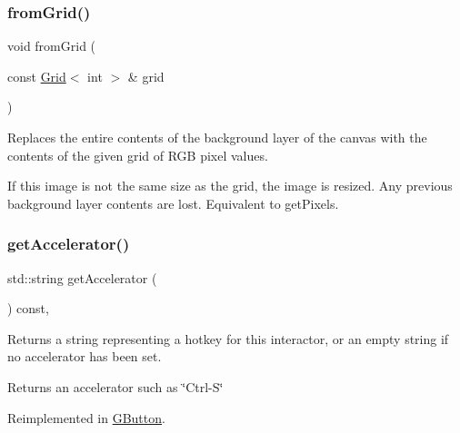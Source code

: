 \subsubsection{\texorpdfstring{from\+Grid()}{fromGrid()}}
{\footnotesize\ttfamily void from\+Grid (\begin{DoxyParamCaption}\item[{const \mbox{\hyperlink{classGrid}{Grid}}$<$ int $>$ \&}]{grid }\end{DoxyParamCaption})\hspace{0.3cm}{\ttfamily [virtual]}}



Replaces the entire contents of the background layer of the canvas with the contents of the given grid of R\+GB pixel values. 

If this image is not the same size as the grid, the image is resized. Any previous background layer contents are lost. Equivalent to get\+Pixels. \mbox{\label{classGInteractor_a69f8d23ed8f207fbecad99960776e942}} 
\subsubsection{\texorpdfstring{get\+Accelerator()}{getAccelerator()}}
{\footnotesize\ttfamily std\+::string get\+Accelerator (\begin{DoxyParamCaption}{ }\end{DoxyParamCaption}) const\hspace{0.3cm}{\ttfamily [virtual]}, {\ttfamily [inherited]}}



Returns a string representing a hotkey for this interactor, or an empty string if no accelerator has been set. 

\begin{DoxyReturn}{Returns}
an accelerator such as \char`\"{}\+Ctrl-\/\+S\char`\"{} 
\end{DoxyReturn}


Reimplemented in \mbox{\hyperlink{classGButton_a432ca43c59ffb2adc9cb66d43621bc27}{G\+Button}}.

\mbox{\label{classGInteractor_a94eb4276000c4fdfb508ce9e6317a82a}} 

